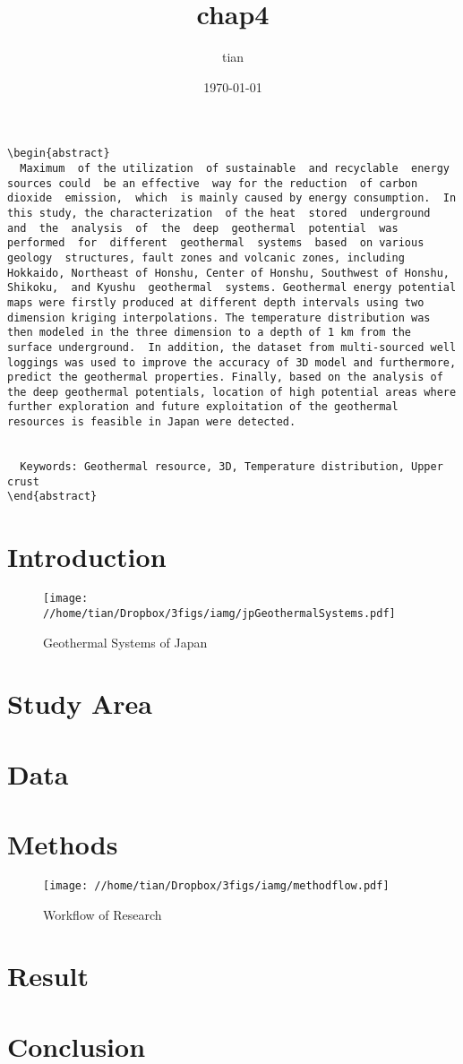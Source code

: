 \documentclass[11pt]{article}
\author{tian}
\date{\today}
\title{chap4}
\begin{document}
\maketitle
\tableofcontents

\begin{verbatim}
\begin{abstract}
  Maximum  of the utilization  of sustainable  and recyclable  energy sources could  be an effective  way for the reduction  of carbon  dioxide  emission,  which  is mainly caused by energy consumption.  In this study, the characterization  of the heat  stored  underground  and  the  analysis  of  the  deep  geothermal  potential  was performed  for  different  geothermal  systems  based  on various geology  structures, fault zones and volcanic zones, including Hokkaido, Northeast of Honshu, Center of Honshu, Southwest of Honshu, Shikoku,  and Kyushu  geothermal  systems. Geothermal energy potential maps were firstly produced at different depth intervals using two dimension kriging interpolations. The temperature distribution was then modeled in the three dimension to a depth of 1 km from the surface underground.  In addition, the dataset from multi-sourced well loggings was used to improve the accuracy of 3D model and furthermore, predict the geothermal properties. Finally, based on the analysis of the deep geothermal potentials, location of high potential areas where further exploration and future exploitation of the geothermal resources is feasible in Japan were detected.


  Keywords: Geothermal resource, 3D, Temperature distribution, Upper crust
\end{abstract}
\end{verbatim}
\section{Introduction}
\label{sec-1}

\begin{figure}[htb]
\centering
\texttt{[image: //home/tian/Dropbox/3figs/iamg/jpGeothermalSystems.pdf]}
\caption{Geothermal Systems of Japan}
\end{figure}
\section{Study Area}
\label{sec-2}
\section{Data}
\label{sec-3}
\section{Methods}
\label{sec-4}
\begin{figure}[htb]
\centering
\texttt{[image: //home/tian/Dropbox/3figs/iamg/methodflow.pdf]}
\caption{Workflow of Research}
\end{figure}
\section{Result}
\label{sec-5}
\section{Conclusion}
\label{sec-6}
\end{document}
